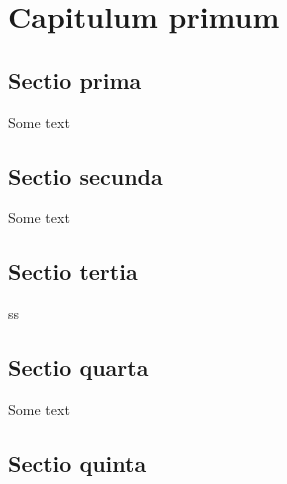 \documentclass{book}
\begin{document}
\tableofcontents

\chapter{Capitulum primum}

\startcontents[section]

\section{Sectio prima}
Some text

\section{Sectio secunda}
Some text

\section{Sectio tertia}

ss
\section{Sectio quarta}
Some text

\section{Sectio quinta}


\stopcontents[section]
\contentsfinish
\end{document}
